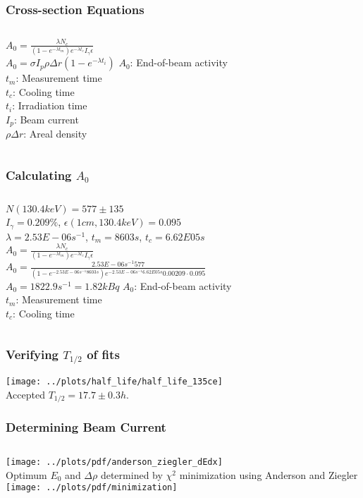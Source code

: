 \documentclass[12pt,xcolor=dvipsnames]{beamer}
\begin{document}
\begin{frame}
\frametitle{Cross-section Equations}
\begin{columns}[c]
\column{2.5in}
$A_0 = \frac{\lambda N_c}{(1-e^{-\lambda t_m})e^{-\lambda t_c}I_{\gamma}\epsilon}$
\\
$A_0 = \sigma I_p \rho \Delta r (1-e^{-\lambda t_i})$
\column{1.5in}
$A_0$: End-of-beam activity\\
$t_m$: Measurement time\\
$t_c$: Cooling time\\
$t_i$: Irradiation time\\
$I_p$: Beam current\\
$\rho \Delta r$: Areal density\\
\end{columns}
\end{frame}

\begin{frame}
\frametitle{Calculating $A_0$}
\begin{columns}[c]
\column{3.0in}
$N(130.4keV) = 577 \pm 135$ \\
$I_{\gamma}=0.209 \%$, $\epsilon (1cm,130.4keV) = 0.095$\\
$\lambda = 2.53E-06 s^{-1}$, $t_m = 8603 s$, $t_c = 6.62E05 s$\\
$A_0 = \frac{\lambda N_c}{(1-e^{-\lambda t_m})e^{-\lambda t_c}I_{\gamma}\epsilon}$ \\
$A_0 = \frac{2.53E-06 s^{-1} 577}{(1-e^{-2.53E-06 s^{-1} 8603s})e^{-2.53E-06 s^{-1} 6.62E05s}0.00209\cdot 0.095}$ \\
$A_0 = 1822.9 s^{-1} = 1.82 kBq$
\column{1.0in}
$A_0$: End-of-beam activity\\
$t_m$: Measurement time\\
$t_c$: Cooling time\\
\end{columns}
\end{frame}

\begin{frame}
\frametitle{Verifying $T_{1/2}$ of fits}
\texttt{[image: ../plots/half\_life/half\_life\_135ce]}
\\
Accepted $T_{1/2}=17.7\pm 0.3 h$.
\end{frame}

\begin{frame}
\frametitle{Determining Beam Current}
\begin{columns}[c]
\column{1.5in}
\texttt{[image: ../plots/pdf/anderson\_ziegler\_dEdx]}
\\
Optimum $E_0$ and $\Delta \rho$ determined by $\chi^2$ minimization using Anderson and Ziegler
\column{2.5in}
\texttt{[image: ../plots/pdf/minimization]}
\end{columns}
\end{frame}
\end{document}
